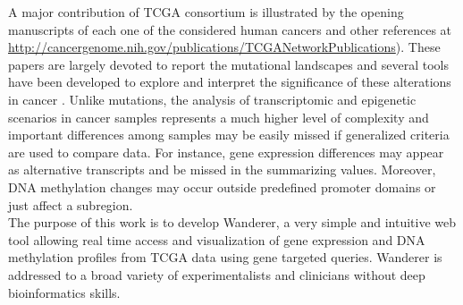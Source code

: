 \documentclass{bmcart}
\begin{document}
A major contribution of TCGA consortium is illustrated by the opening manuscripts of each one of the considered human cancers \cite{weinstein2013cancer} and other references at \url{http://cancergenome.nih.gov/publications/TCGANetworkPublications}). These papers are largely devoted to report the mutational landscapes and several tools have been developed to explore and interpret the significance of these alterations in cancer \cite{gonzalez2013intogen}. Unlike mutations, the analysis of transcriptomic and epigenetic scenarios in cancer samples represents a much higher level of complexity and important differences among samples may be easily missed if generalized criteria are used to compare data. For instance, gene expression differences may appear as alternative transcripts and be missed in the summarizing values. Moreover, DNA methylation changes may occur outside predefined promoter domains or just affect a subregion.\\ 

The purpose of this work is to develop Wanderer, a very simple and intuitive web tool allowing real time access and visualization of gene expression and DNA methylation profiles from TCGA data using gene targeted queries. Wanderer is addressed to a broad variety of experimentalists and clinicians without deep bioinformatics skills.\\       
  





\end{document}
